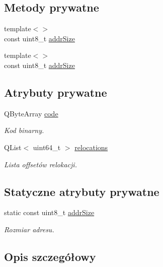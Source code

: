 \subsection*{Metody prywatne}
\begin{DoxyCompactItemize}
\item 
{\footnotesize template$<$$>$ }\\const uint8\-\_\-t \hyperlink{class_binary_code_a61d31942270e2200c91333f5b4717c35}{addr\-Size}
\item 
{\footnotesize template$<$$>$ }\\const uint8\-\_\-t \hyperlink{class_binary_code_a55498c908569d84e505b5eda3301c08f}{addr\-Size}
\end{DoxyCompactItemize}
\subsection*{Atrybuty prywatne}
\begin{DoxyCompactItemize}
\item 
Q\-Byte\-Array \hyperlink{class_binary_code_aa680c4ee3718fe9c7998b3ab072fc01a}{code}
\begin{DoxyCompactList}\small\item\em Kod binarny. \end{DoxyCompactList}\item 
Q\-List$<$ uint64\-\_\-t $>$ \hyperlink{class_binary_code_a1816cae03a267887d41a56c6421c0d2d}{relocations}
\begin{DoxyCompactList}\small\item\em Lista offsetów relokacji. \end{DoxyCompactList}\end{DoxyCompactItemize}
\subsection*{Statyczne atrybuty prywatne}
\begin{DoxyCompactItemize}
\item 
static const uint8\-\_\-t \hyperlink{class_binary_code_a1e49b1b07e4062b2be95de92c757f783}{addr\-Size}
\begin{DoxyCompactList}\small\item\em Rozmiar adresu. \end{DoxyCompactList}\end{DoxyCompactItemize}


\subsection{Opis szczegółowy}
